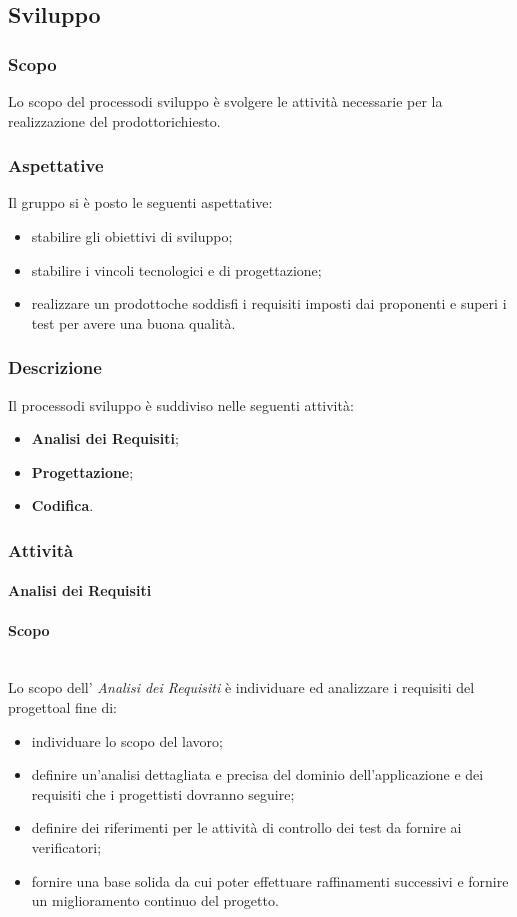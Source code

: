 \subsection{Sviluppo}
\subsubsection{Scopo}
Lo scopo del processo\glosp di sviluppo è svolgere le attività necessarie per la realizzazione del prodotto\glosp richiesto.
\subsubsection{Aspettative}
Il gruppo si è posto le seguenti aspettative:
\begin{itemize}
	\item stabilire gli obiettivi di sviluppo;
	\item stabilire i vincoli tecnologici e di progettazione\glo;
	\item realizzare un prodotto\glosp che soddisfi i requisiti imposti dai proponenti e superi i test per avere una buona qualità.
\end{itemize}
\subsubsection{Descrizione}
Il processo\glosp di sviluppo è suddiviso nelle seguenti attività:
\begin{itemize}
	\item \textbf{Analisi dei Requisiti};
	\item \textbf{Progettazione}\glo;
	\item \textbf{Codifica}.
\end{itemize}
\subsubsection{Attività}
\paragraph{Analisi dei Requisiti}
\paragraph*{Scopo}\mbox{}\\ [1mm] 
Lo scopo dell' \textit{Analisi dei Requisiti} è individuare ed analizzare i requisiti del progetto\glosp al fine di:
\begin{itemize}
	\item individuare lo scopo del lavoro;
	\item definire un'analisi dettagliata e precisa del dominio dell'applicazione e dei requisiti che i progettisti dovranno seguire;
	\item definire dei riferimenti per le attività di controllo dei test da fornire ai verificatori;
	\item fornire una base solida da cui poter effettuare raffinamenti successivi e fornire un miglioramento continuo del progetto\glo.
\end{itemize}
